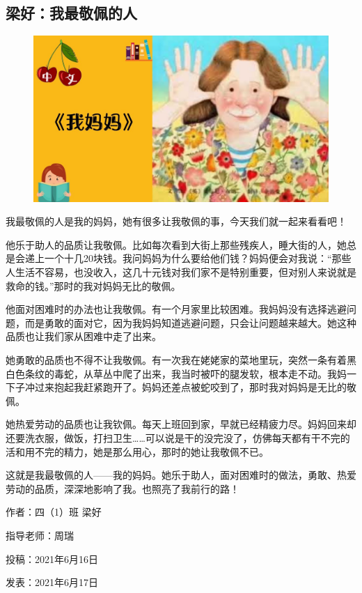 \vspace{10pt}

{\centering\subsection*{梁好：我最敬佩的人}}


\renewcommand{\leftmark}{梁好：我最敬佩的人}

\begin{figure}[htbp]

\centering

\includegraphics[width = .5\textwidth]{./ch/2.jpg}

\end{figure}





我最敬佩的人是我的妈妈，她有很多让我敬佩的事，今天我们就一起来看看吧！

他乐于助人的品质让我敬佩。比如每次看到大街上那些残疾人，睡大街的人，她总是会递上一个十几20块钱。我问妈妈为什么要给他们钱？妈妈便会对我说：“那些人生活不容易，也没收入，这几十元钱对我们家不是特别重要，但对别人来说就是救命的钱。”那时的我对妈妈无比的敬佩。

他面对困难时的办法也让我敬佩。有一个月家里比较困难。我妈妈没有选择逃避问题，而是勇敢的面对它，因为我妈妈知道逃避问题，只会让问题越来越大。她这种品质也让我们家从困难中走了出来。

她勇敢的品质也不得不让我敬佩。有一次我在姥姥家的菜地里玩，突然一条有着黑白色条纹的毒蛇，从草丛中爬了出来，我当时被吓的腿发软，根本走不动。我妈一下子冲过来抱起我赶紧跑开了。妈妈还差点被蛇咬到了，那时我对妈妈是无比的敬佩。

她热爱劳动的品质也让我钦佩。每天上班回到家，早就已经精疲力尽。妈妈回来却还要洗衣服，做饭，打扫卫生……可以说是干的没完没了，仿佛每天都有干不完的活和用不完的精力，她是那么用心，那时的她让我敬佩不已。

这就是我最敬佩的人——我的妈妈。她乐于助人，面对困难时的做法，勇敢、热爱劳动的品质，深深地影响了我。也照亮了我前行的路！





\vspace{10pt}



作者：四（1）班 梁好



指导老师：周瑞



投稿：2021年6月16日



发表：2021年6月17日






                



\vspace{10pt}

\hline



